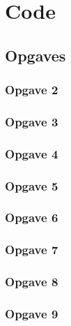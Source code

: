 \documentclass[11pt, a4paper, titlepage, openright]{article}
\begin{document}
\onecolumn
\appendix
\appendixpage
\addappheadtotoc

\section{Code}
	\subsection{Opgaves}
		\subsubsection{Opgave 2}
			
			
		\bigskip
		\subsubsection{Opgave 3}
			
		\bigskip
		\subsubsection{Opgave 4}
			

		\bigskip
		\subsubsection{Opgave 5}
			
		\bigskip
		\subsubsection{Opgave 6}
			
			
		\bigskip
		\subsubsection{Opgave 7}
			
		\bigskip
		\subsubsection{Opgave 8}
			
		\bigskip
		\subsubsection{Opgave 9}
			
		\bigskip
\end{document}
